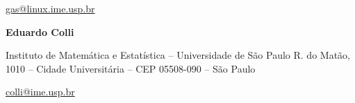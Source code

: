 {\centering{}
\href{mailto:gas@linux.ime.usp.br}{gas@linux.ime.usp.br}
\par}

{\centering{}\bfseries
Eduardo Colli
\par}

{\centering{}
Instituto de Matem\'atica e Estat\'istica {--} Universidade de S\~ao
Paulo\newline
R. do Mat\~ao, 1010 {--} Cidade Universit\'aria {--} CEP 05508{}-090
{--} S\~ao Paulo
\par}

{\centering{}
\href{mailto:colli@ime.usp.br}{\foreignlanguage{english}{colli@ime.usp.br}}
\par}


\par




